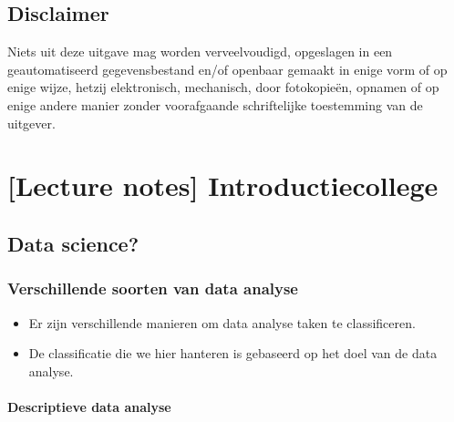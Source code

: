 \documentclass[]{tufte-book}
\providecommand{\tightlist}{%
  \setlength{\itemsep}{0pt}\setlength{\parskip}{0pt}}
\begin{document}
\hypertarget{disclaimer}{%
\section*{Disclaimer}\label{disclaimer}}

Niets uit deze uitgave mag worden verveelvoudigd, opgeslagen in een geautomatiseerd gegevensbestand en/of openbaar gemaakt in enige vorm of op enige wijze, hetzij elektronisch, mechanisch, door fotokopieën, opnamen of op enige andere manier zonder voorafgaande schriftelijke toestemming van de uitgever.

\hypertarget{lecture-notes-introductiecollege}{%
\chapter{{[}Lecture notes{]} Introductiecollege}\label{lecture-notes-introductiecollege}}

\hypertarget{data-science}{%
\section{Data science?}\label{data-science}}

\hypertarget{verschillende-soorten-van-data-analyse}{%
\subsection{Verschillende soorten van data analyse}\label{verschillende-soorten-van-data-analyse}}

\begin{itemize}
\tightlist
\item
  Er zijn verschillende manieren om data analyse taken te classificeren.
\item
  De classificatie die we hier hanteren is gebaseerd op het doel van de data analyse.
\end{itemize}

\hypertarget{descriptieve-data-analyse}{%
\subsubsection*{Descriptieve data analyse}\label{descriptieve-data-analyse}}
\end{document}
